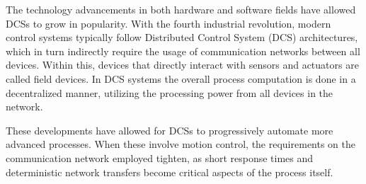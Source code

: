 The technology advancements in both hardware and software fields have allowed DCSs to grow in popularity.
With the fourth industrial revolution, modern control systems typically follow Distributed Control System (DCS) architectures, which in turn indirectly require the usage of communication networks between all devices.
Within this, devices that directly interact with sensors and actuators are called field devices.
In DCS systems the overall process computation is done in a decentralized manner, utilizing the processing power from all devices in the network.

These developments have allowed for DCSs to progressively automate more advanced processes.
When these involve motion control, the requirements on the communication network employed tighten, as short response times and deterministic network transfers become critical aspects of the process itself.
